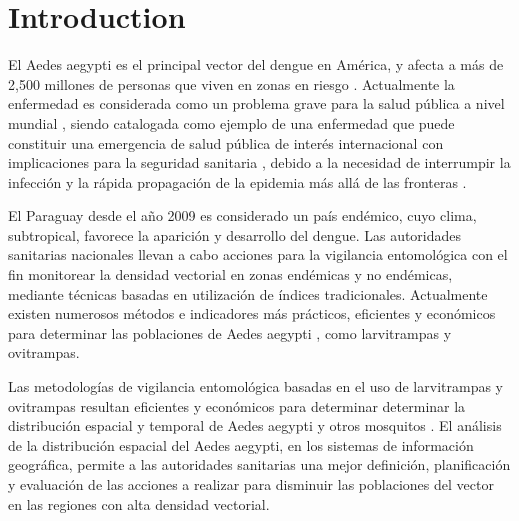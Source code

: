 \section{Introduction}
El Aedes aegypti es el principal vector del dengue en América, y afecta a más de 2,500 millones
de personas que viven en zonas en riesgo \cite{world2009dengue, gustavo2006dengue}. Actualmente la enfermedad es considerada como un problema grave para la salud pública a nivel mundial
\cite{dengueUruguayCap1, world2009dengue, DIBO2005}, siendo catalogada como ejemplo de una
enfermedad que puede constituir una emergencia de salud pública de interés internacional con
implicaciones para la seguridad sanitaria \cite{dengueUruguayCap1, world2009dengue}, debido a la
necesidad de interrumpir la infección y la rápida propagación de la epidemia más allá de las
fronteras \cite{world2009dengue}.

El Paraguay desde el año 2009 es considerado un país endémico, cuyo clima, subtropical, favorece
la aparición y desarrollo del dengue. Las autoridades sanitarias nacionales llevan a cabo
acciones para la vigilancia entomológica con el fin monitorear la densidad vectorial en zonas
endémicas y no endémicas, mediante técnicas basadas en utilización de índices tradicionales.
Actualmente existen numerosos métodos e indicadores más prácticos, eficientes y económicos para
determinar las poblaciones de Aedes aegypti \cite{cenaprece2013}, como larvitrampas y ovitrampas.

Las metodologías de vigilancia entomológica basadas en el uso de larvitrampas y ovitrampas
resultan eficientes y económicos para determinar determinar la distribución espacial y temporal de
Aedes aegypti y otros mosquitos \cite{dengueUruguayCap1, cenaprece2013}. El análisis de la
distribución espacial del Aedes aegypti, en los sistemas de información geográfica, permite a las
autoridades sanitarias una mejor definición, planificación y evaluación de las acciones a realizar
para disminuir las poblaciones del vector en las regiones con alta densidad vectorial.
